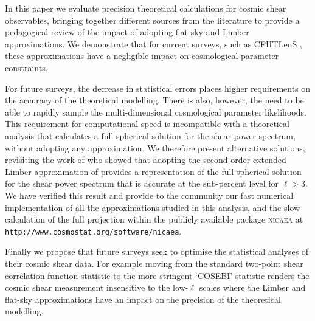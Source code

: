 In this paper we evaluate precision theoretical calculations for cosmic shear
observables, bringing together different sources from the literature to provide
a pedagogical review of the impact of adopting flat-sky and Limber
approximations.  We demonstrate that for current surveys, such as CFHTLenS
, these approximations have a negligible impact on cosmological
parameter constraints.

For future surveys, the decrease in statistical errors places higher
requirements on the accuracy of the theoretical modelling.    There is also,
however, the need to be able to rapidly sample the multi-dimensional
cosmological parameter likelihoods.  This requirement for computational speed
is incompatible with a theoretical analysis that calculates a full spherical
solution for the shear power spectrum, without adopting any approximation.  We
therefore present alternative solutions, revisiting the work of
\citet{2012PhRvD..86b3001B} who showed that adopting the second-order extended
Limber approximation of \citet{2008PhRvD..78l3506L} provides a representation
of the full spherical solution for the shear power spectrum that is accurate at
the sub-percent level for $\ell > 3$.    We have verified this result and
provide to the community our fast numerical implementation of all the
approximations studied in this analysis, and the slow calculation of the full
projection within the publicly available package \textsc{nicaea} at
\texttt{http://www.cosmostat.org/software/nicaea}.

Finally we propose that future surveys seek to optimise the statistical
analyses of their cosmic shear data.  For example moving from the standard
two-point shear correlation function statistic to the more stringent `COSEBI'
statistic \citep{COSEBIs} renders the cosmic shear measurement insensitive to
the low-$\ell$ scales where the Limber and flat-sky approximations have an
impact on the precision of the theoretical modelling.  

